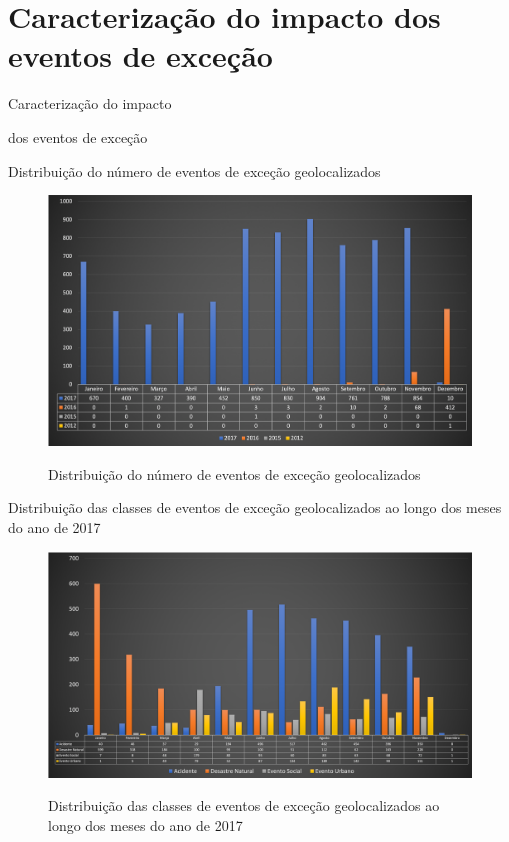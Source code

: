 \documentclass{beamer}
\begin{document}
\section{Caracterização do impacto dos eventos de exceção}
\begin{frame}
\Huge{\centerline{Caracterização do impacto}}
\Huge{\centerline{dos eventos de exceção}}
\end{frame}
\begin{frame}{Distribuição do número de eventos de exceção geolocalizados}
\begin{figure}[!htb]
	\centering
 	  \caption{Distribuição do número de eventos de exceção geolocalizados}
		\includegraphics[width=0.8\linewidth]{geolocated_exception_events_distribution_pt.png}
	\label{fig:geolocated_exception_events_distribution}
\end{figure}
\end{frame}
\begin{frame}{Distribuição das classes de eventos de exceção geolocalizados ao longo dos meses do ano de 2017}
\begin{figure}[!htb]
	\centering
 	  \caption{Distribuição das classes de eventos de exceção geolocalizados ao longo dos meses do ano de 2017}
		\includegraphics[width=0.8\linewidth]{exception_events_classification_distribution_pt.png}
	\label{fig:exception_events_classification_distribution}
\end{figure}
\end{frame}
\end{document}
